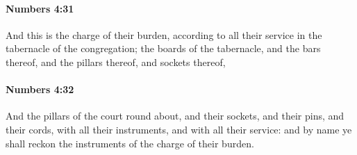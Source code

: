 		\paragraph{Numbers 4:31} %
			\label{NUMBERS-4-31}

			And this is the charge of their burden, according to all their service in the tabernacle of the congregation; the boards of the tabernacle, and the bars thereof, and the pillars thereof, and sockets thereof,


		\paragraph{Numbers 4:32} %
			\label{NUMBERS-4-32}

			And the pillars of the court round about, and their sockets, and their pins, and their cords, with all their instruments, and with all their service: and by name ye shall reckon the instruments of the charge of their burden.

